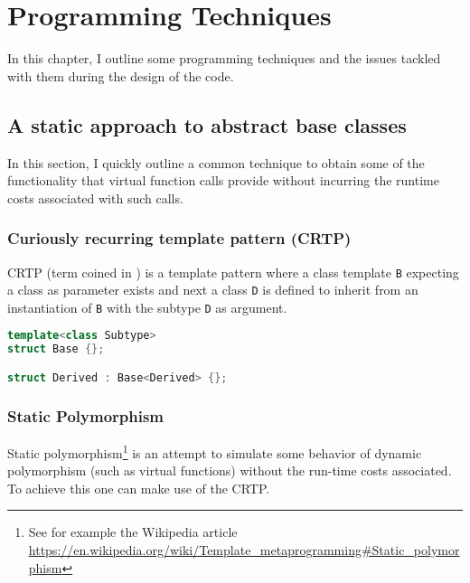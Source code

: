 
\chapter{Programming Techniques} %

\label{progtech} %


In this chapter, I outline some programming techniques and the issues tackled with them during the design of the code.
\section{A static approach to abstract base classes}
In this section, I quickly outline a common technique to obtain some of the functionality that virtual function calls provide without incurring the runtime costs associated with such calls.

\subsection{Curiously recurring template pattern (CRTP)}
CRTP (term coined in \cite{C_CRTP}) is a template pattern where a class template \texttt{B} expecting a class as parameter exists and next a class \texttt{D} is defined to inherit from an instantiation of \texttt{B} with the subtype \texttt{D} as argument.

\begin{lstlisting}[language=C++]
template<class Subtype>
struct Base {};

struct Derived : Base<Derived> {};
\end{lstlisting}

\subsection{Static Polymorphism}
Static polymorphism\footnote{See for example the Wikipedia article \url{https://en.wikipedia.org/wiki/Template_metaprogramming\#Static_polymorphism}} is an attempt to simulate some behavior of dynamic polymorphism (such as virtual functions) without the run-time costs associated. To achieve this one can make use of the CRTP. 

